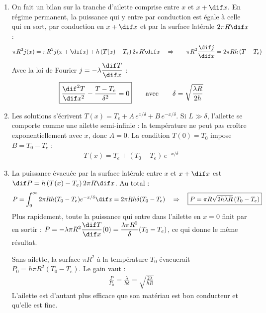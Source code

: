 \newpage

\begin{correction}

\begin{enumerate}

	\item On fait un bilan sur la tranche d'ailette comprise entre $x$ et $x+\dif x$. En régime permanent, la puissance qui y entre par conduction est égale à celle qui en sort, par conduction en $x+\dif x$ et par la surface latérale $2\pi R\dif x$ :
	\begin{align*}
		\pi R^2j(x)=\pi R^2j(x+\dif x)+h\left(T(x)-T_e\right)2\pi R\dif x \quad\Rightarrow\quad -\pi R^2\frac{\dif j}{\dif x}=2\pi Rh\left(T-T_e\right)
	\end{align*}
	Avec la loi de Fourier $j=-\lambda\dfrac{\dif T}{\dif x}$ :
	\begin{align*}
		\boxed{\frac{\dif^2 T}{\dif x^2}-\frac{T-T_e}{\delta^2}=0} \qquad\text{avec}\qquad \delta=\sqrt{\frac{\lambda R}{2h}}
	\end{align*}

	\item Les solutions s'écrivent $T(x)=T_e+A\,e^{x/\delta}+B\,e^{-x/\delta}$. Si $L\gg\delta$, l'ailette se comporte comme une ailette semi-infinie : la température ne peut pas croître exponentiellement avec $x$, donc $A=0$. La condition $T(0)=T_0$ impose $B=T_0-T_e$ :
	\begin{align*}
		\boxed{T(x)=T_e+(T_0-T_e)\,e^{-x/\delta}}
	\end{align*}

	\item La puissance évacuée par la surface latérale entre $x$ et $x+\dif x$ est $\dif P=h\left(T(x)-T_e\right)2\pi R\dif x$. Au total :
	\begin{align*}
		P=\int_0^{\infty}2\pi Rh(T_0-T_e)e^{-x/\delta}\dif x=2\pi Rh\delta(T_0-T_e) \quad\Rightarrow\quad \boxed{P=\pi R\sqrt{2h\lambda R}\,(T_0-T_e)}
	\end{align*}
	Plus rapidement, toute la puissance qui entre dans l'ailette en $x=0$ finit par en sortir : $P=-\lambda\pi R^2\dfrac{\dif T}{\dif x}(0)=\dfrac{\lambda\pi R^2}{\delta}(T_0-T_e)$, ce qui donne le même résultat.

	Sans ailette, la surface $\pi R^2$ à la température $T_0$ évacuerait $P_0=h\pi R^2(T_0-T_e)$. Le gain vaut :
	\begin{align*}
		\frac{P}{P_0}=\frac{\lambda}{h\delta}=\sqrt{\frac{2\lambda}{hR}}
	\end{align*}
	L'ailette est d'autant plus efficace que son matériau est bon conducteur et qu'elle est fine.


\end{enumerate}
\end{correction}
